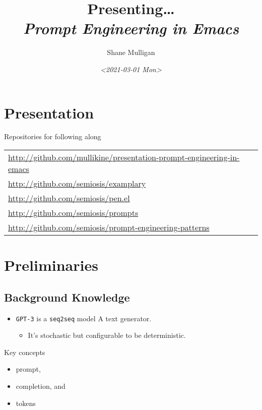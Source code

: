 \documentclass[presentation]{beamer}
\author{Shane Mulligan \\  }
\date{\textit{<2021-03-01 Mon>}}
\title{Presenting\ldots{} \\   \emph{\alert{Prompt Engineering in Emacs}} \\  }
\begin{document}
\maketitle

\section{Presentation}
\label{sec:orgf083607}
\begin{frame}[label={sec:org2df968d}]{Repositories for following along}
{\footnotesize
\begin{center}
\begin{tabular}{l}
\url{http://github.com/mullikine/presentation-prompt-engineering-in-emacs}\\
\url{http://github.com/semiosis/examplary}\\
\url{http://github.com/semiosis/pen.el}\\
\url{http://github.com/semiosis/prompts}\\
\url{http://github.com/semiosis/prompt-engineering-patterns}\\
\end{tabular}
\end{center}
}
\end{frame}

\section{Preliminaries}
\label{sec:org629ed9f}
\subsection{Background Knowledge}
\label{sec:org1065c2b}
\begin{itemize}
\item \texttt{GPT-3} is a \texttt{seq2seq} model
A text generator.
\begin{itemize}
\item It's stochastic
but configurable to be deterministic.
\end{itemize}
\end{itemize}

\begin{frame}[label={sec:org0169f84}]{Key concepts}
\begin{itemize}
\item prompt,
\item completion, and
\item tokens
\end{itemize}
\end{frame}
\end{document}
